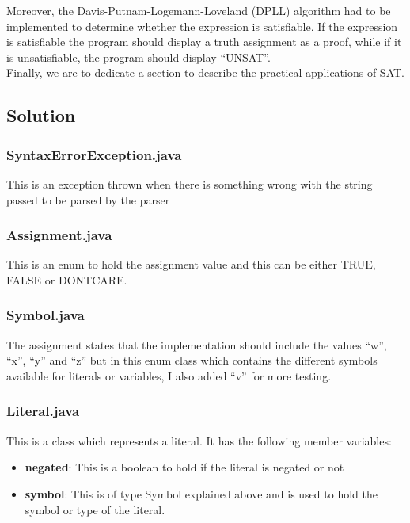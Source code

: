 \documentclass{article}
\newcommand{\quotes}[1]{``#1''}
\begin{document}
				\noindent Moreover, the Davis-Putnam-Logemann-Loveland (DPLL) algorithm had to be implemented to determine whether the expression is satisfiable. If the expression is satisfiable the program should display a truth assignment as a proof, while if it is unsatisfiable, the program should display \quotes{UNSAT}.\\
				
\noindent Finally, we are to dedicate a section to describe the practical applications of SAT. 

		\subsection{Solution}
		
		\subsubsection{SyntaxErrorException.java}
		
		This is an exception thrown when there is something wrong with the string passed to be parsed by the parser
		
		
		\subsubsection{Assignment.java}
		
		This is an enum to hold the assignment value and this can be either TRUE, FALSE or DONTCARE.
		
		\subsubsection{Symbol.java}
		
		The assignment states that the implementation should include the values  \quotes{w}, \quotes{x}, \quotes{y} and \quotes{z} but in this enum class which contains the different symbols available for literals or variables, I also added  \quotes{v} for more testing.
		
		\subsubsection{Literal.java}
		
		This is a class which represents a literal. It has the following member variables:
		\begin{itemize}
		\item \textbf{negated}: This is a boolean to hold if the literal is negated or not
		\item \textbf{symbol}: This is of type Symbol explained above and is used to hold the symbol or type of the literal.
		\end{itemize}
		
\end{document}
